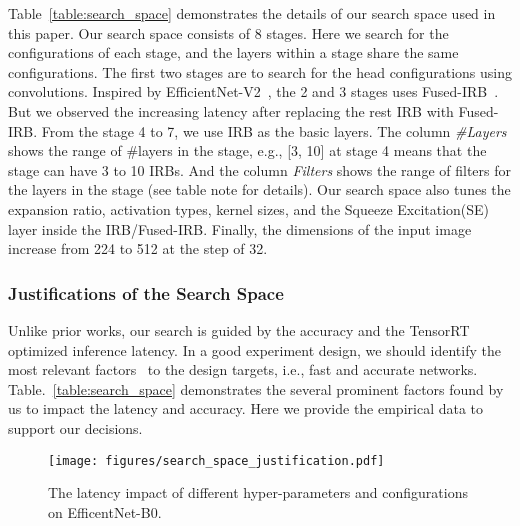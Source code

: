 \documentclass[10pt,twocolumn,letterpaper]{article}
\begin{document}
Table~\ref{table:search_space} demonstrates the details of our search space used in this paper. Our search space consists of 8 stages. Here we search for the configurations of each stage, and the layers within a stage share the same configurations. The first two stages are to search for the head configurations using convolutions. Inspired by EfficientNet-V2~\cite{tan2021efficientnetv2}, the 2 and 3 stages uses Fused-IRB~\cite{tan2021efficientnetv2}. But we observed the increasing latency after replacing the rest IRB with Fused-IRB. From the stage 4 to 7, we use IRB as the basic layers. The column \textit{\#Layers} shows the range of \#layers in the stage, e.g., [3, 10] at stage 4 means that the stage can have 3 to 10 IRBs. And the column \textit{Filters} shows the range of filters for the layers in the stage (see table note for details). Our search space also tunes the expansion ratio, activation types, kernel sizes, and the Squeeze Excitation(SE)~\cite{hu2018squeeze} layer inside the IRB/Fused-IRB. Finally, the dimensions of the input image increase from 224 to 512 at the step of 32.

\subsubsection{Justifications of the Search Space}
Unlike prior works, our search is guided by the accuracy and the TensorRT optimized inference latency. In a good experiment design, we should identify the most relevant factors~\cite{kempthorne1952design} to the design targets, i.e., fast and accurate networks. Table.~\ref{table:search_space} demonstrates the several prominent factors found by us to impact the latency and accuracy. Here we provide the empirical data to support our decisions.

\begin{figure}[t]
\vspace{-0.5cm}
\centering 
  \begin{center}
    \texttt{[image: figures/search\_space\_justification.pdf]}
  \end{center}
  \vspace{-0.3cm}
    \caption{The latency impact of different hyper-parameters and configurations on EfficentNet-B0.}
    \label{fig:search_space_justification}
\end{figure}
\end{document}
